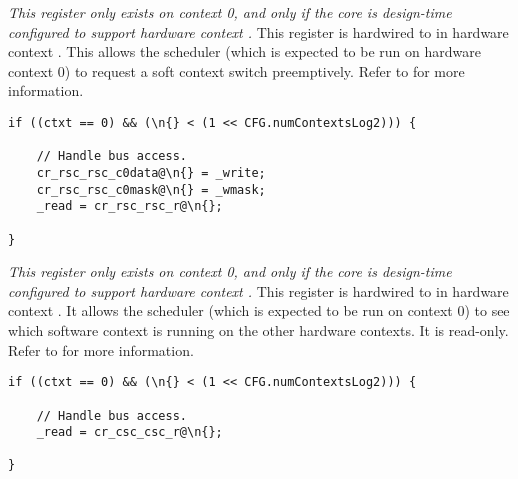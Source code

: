 
\emph{This register only exists on context 0, and only if the core is
design-time configured to support hardware context \n{}.} This register is 
hardwired to  in hardware context \n{}. This allows the scheduler
(which is expected to be run on hardware context 0) to request a soft context
switch preemptively. Refer to  for more information.

\implementation{}
\begin{lstlisting}
if ((ctxt == 0) && (\n{} < (1 << CFG.numContextsLog2))) {
    
    // Handle bus access.
    cr_rsc_rsc_c0data@\n{} = _write;
    cr_rsc_rsc_c0mask@\n{} = _wmask;
    _read = cr_rsc_rsc_r@\n{};
    
}
\end{lstlisting}


\emph{This register only exists on context 0, and only if the core is
design-time configured to support hardware context \n{}.} This register is 
hardwired to  in hardware context \n{}. It allows the scheduler
(which is expected to be run on context 0) to see which software context is
running on the other hardware contexts. It is read-only. Refer to  for
more information.

\implementation{}
\begin{lstlisting}
if ((ctxt == 0) && (\n{} < (1 << CFG.numContextsLog2))) {
    
    // Handle bus access.
    _read = cr_csc_csc_r@\n{};
    
}
\end{lstlisting}

